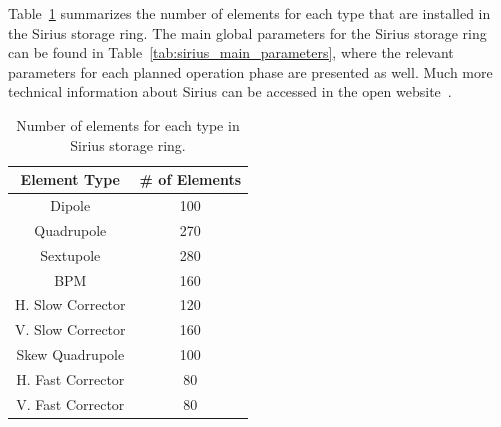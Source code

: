 Table~\ref{tab:sirius_elements} summarizes the number of elements for each type that are installed in the Sirius storage ring. The main global parameters for the Sirius storage ring can be found in Table~\ref{tab:sirius_main_parameters}, where the relevant parameters for each planned operation phase are presented as well. Much more technical information about Sirius can be accessed in the open website~\cite{wiki}.
\begin{table}
        \centering
        \caption{Number of elements for each type in Sirius storage ring.}
        \label{tab:sirius_elements}
        \begin{tabular}{cc}
            \toprule\toprule
            Element Type & \# of Elements \\
            \hline
            Dipole              & 100 \\
            Quadrupole          & 270 \\
            Sextupole           & 280 \\
            BPM & 160 \\
            H. Slow Corrector & 120 \\
            V. Slow Corrector & 160 \\
            Skew Quadrupole & 100 \\
            H. Fast Corrector & 80 \\
            V. Fast Corrector & 80 \\
            \bottomrule\bottomrule
        \end{tabular}
\end{table}
